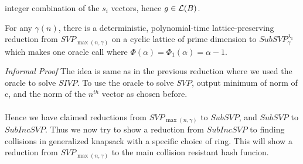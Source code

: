 integer combination of the $s_i$ vectors, hence $g \in \mathcal{L}(B)$.
\begin{proposition}
	For any $\gamma(n)$, there is a deterministic, polynomial-time lattice-preserving
	reduction from $SVP_{\max(n,\gamma)}$ on a cyclic lattice of prime dimension to $SubSVP_\gamma^{\lambda_1}$ which makes one oracle call where $\Phi(\alpha) = \Phi_1(\alpha) = \alpha - 1$.
\end{proposition}
\textit{Informal Proof} The idea is same as in the previous reduction where we used the oracle to solve $SIVP$. To use the oracle to solve $SVP$, output minimum of norm of c, and the norm of the $n^{th}$ vector as chosen before.
\\~\\
Hence we have claimed reductions from $SVP_{\max(n,\gamma)}$ to $SubSVP$, and $SubSVP$ to $SubIncSVP$. Thus we now try to show a reduction from $SubIncSVP$ to finding collisions in generalized knapsack with a specific choice of ring. This will show a reduction from $SVP_{\max(n,\gamma)}$ to the main collision resistant hash funcion.